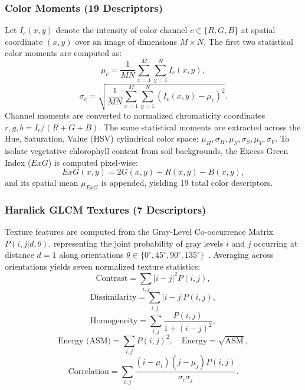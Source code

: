 \documentclass[conference]{IEEEtran}
\begin{document}
\subsubsection{Color Moments (19 Descriptors)}
Let $I_c(x, y)$ denote the intensity of color channel $c \in \{R, G, B\}$ at spatial coordinate $(x, y)$ over an image of dimensions $M \times N$. The first two statistical color moments are computed as:
\begin{equation}
\mu_c = \frac{1}{MN} \sum_{x=1}^M \sum_{y=1}^N I_c(x, y),
\end{equation}
\begin{equation}
\sigma_c = \sqrt{\frac{1}{MN} \sum_{x=1}^M \sum_{y=1}^N \left( I_c(x, y) - \mu_c \right)^2}.
\end{equation}
Channel moments are converted to normalized chromaticity coordinates $r, g, b = I_c / (R + G + B)$. The same statistical moments are extracted across the Hue, Saturation, Value (HSV) cylindrical color space: $\mu_H, \sigma_H, \mu_S, \sigma_S, \mu_V, \sigma_V$. To isolate vegetative chlorophyll content from soil backgrounds, the Excess Green Index ($ExG$) is computed pixel-wise:
\begin{equation}
ExG(x, y) = 2G(x, y) - R(x, y) - B(x, y),
\end{equation}
and its spatial mean $\mu_{ExG}$ is appended, yielding 19 total color descriptors.

\subsubsection{Haralick GLCM Textures (7 Descriptors)}
Texture features are computed from the Gray-Level Co-occurrence Matrix $P(i, j | d, \theta)$, representing the joint probability of gray levels $i$ and $j$ occurring at distance $d=1$ along orientations $\theta \in \{0^\circ, 45^\circ, 90^\circ, 135^\circ\}$~\cite{haralick1973texture}. Averaging across orientations yields seven normalized texture statistics:
\begin{equation}
\text{Contrast} = \sum_{i,j} |i - j|^2 P(i, j),
\end{equation}
\begin{equation}
\text{Dissimilarity} = \sum_{i,j} |i - j| P(i, j),
\end{equation}
\begin{equation}
\text{Homogeneity} = \sum_{i,j} \frac{P(i, j)}{1 + (i - j)^2},
\end{equation}
\begin{equation}
\text{Energy (ASM)} = \sum_{i,j} P(i, j)^2, \quad \text{Energy} = \sqrt{\text{ASM}},
\end{equation}
\begin{equation}
\text{Correlation} = \sum_{i,j} \frac{(i - \mu_i)(j - \mu_j) P(i, j)}{\sigma_i \sigma_j}.
\end{equation}
\end{document}
